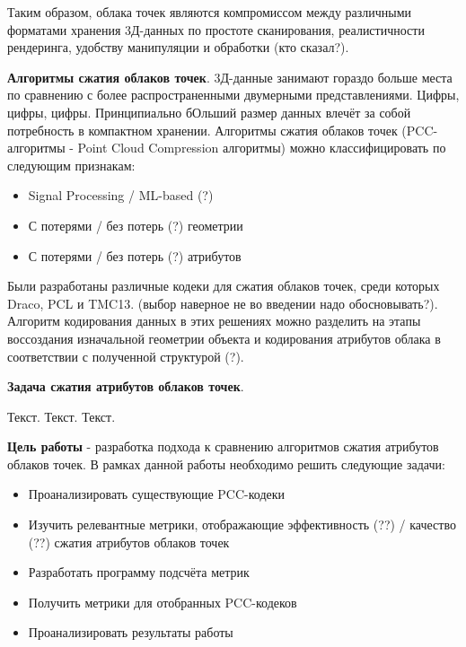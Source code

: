 Таким образом, облака точек являются компромиссом между различными форматами
хранения 3Д-данных по простоте сканирования, реалистичности рендеринга, удобству
манипуляции и обработки (кто сказал?).

\textbf{Алгоритмы сжатия облаков точек}. 3Д-данные занимают гораздо больше места
по сравнению с более распространенными двумерными представлениями. Цифры, цифры,
цифры. Принципиально бОльший размер данных влечёт за собой потребность в
компактном хранении. Алгоритмы сжатия облаков точек (PCC-алгоритмы - Point Cloud
Compression алгоритмы) можно классифицировать по следующим признакам:

\begin{itemize}
    \item Signal Processing / ML-based (?)
    \item С потерями / без потерь (?) геометрии
    \item С потерями / без потерь (?) атрибутов
\end{itemize}

Были разработаны различные кодеки для сжатия облаков точек, среди которых Draco,
PCL и TMC13. (выбор наверное не во введении надо обосновывать?). Алгоритм
кодирования данных в этих решениях можно разделить на этапы воссоздания
изначальной геометрии объекта и кодирования атрибутов облака в соответствии с
полученной структурой (?).

\textbf{Задача сжатия атрибутов облаков точек}.

Текст. Текст. Текст.

\textbf{Цель работы} - разработка подхода к сравнению алгоритмов сжатия
атрибутов облаков точек. В рамках данной работы необходимо решить следующие
задачи:

\begin{itemize}
    \item Проанализировать существующие PCC-кодеки
    \item Изучить релевантные метрики, отображающие эффективность (??) /
    качество (??) сжатия атрибутов облаков точек
    \item Разработать программу подсчёта метрик
    \item Получить метрики для отобранных PCC-кодеков
    \item Проанализировать результаты работы
\end{itemize}


